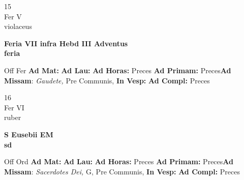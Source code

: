 \documentclass[10pt, openany]{book}
\begin{document}
    \begin{center}
        \begin{minipage}{3.5in}
            \vspace{2em}
            \begin{minipage}{0.5in}
                {\Huge 15} \\
                {\normalsize Fer V} \\
                {\normalsize violaceus}
            \end{minipage}
            \begin{minipage}{3.0in}
                \textbf{ \large Feria VII infra Hebd III Adventus \\
                \textnormal{\normalsize feria}} \\ 
            \end{minipage}
            \begin{justify}Off Fer
                \textbf{Ad Mat: }
                \textbf{Ad Lau: }
                \textbf{Ad Horas: }Preces
                \textbf{Ad Primam: }Preces\textbf{Ad Missam}: \textit{Gaudete,} Pre Communis,  
                \textbf{In Vesp: }
                \textbf{Ad Compl: }Preces
            \end{justify}
        \end{minipage}
    \end{center}

    \begin{center}
        \begin{minipage}{3.5in}
            \vspace{2em}
            \begin{minipage}{0.5in}
                {\Huge 16} \\
                {\normalsize Fer VI} \\
                {\normalsize ruber}
            \end{minipage}
            \begin{minipage}{3.0in}
                \textbf{ \large S Eusebii EM \\
                \textnormal{\normalsize sd}} \\ 
            \end{minipage}
            \begin{justify}Off Ord
                \textbf{Ad Mat: }
                \textbf{Ad Lau: }
                \textbf{Ad Horas: }Preces
                \textbf{Ad Primam: }Preces\textbf{Ad Missam}: \textit{Sacerdotes Dei,} G, Pre Communis,  
                \textbf{In Vesp: }
                \textbf{Ad Compl: }Preces
            \end{justify}
        \end{minipage}
    \end{center}
\end{document}
